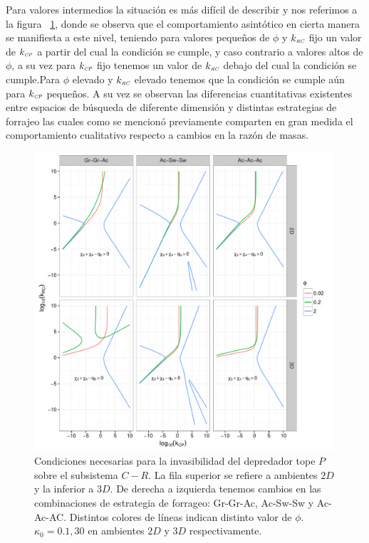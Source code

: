 Para valores intermedios la situaci\'on es m\'as dif\'icil de describir y nos referimos a la figura  ~\ref{fig:NC_PCR}, donde se observa que el comportamiento asint\'otico en cierta manera se manifiesta a este nivel, teniendo para valores peque\~nos de $\phi$ y $k_{\textit{\tiny RC}}$ fijo un valor de $k_{\textit{\tiny CP}}$ a partir del cual la condici\'on se cumple, y caso contrario a valores altos de $\phi$, a su vez para $k_{\textit{\tiny CP}}$ fijo tenemos un valor de $k_{\textit{\tiny RC}}$ debajo del cual la condici\'on se cumple.Para $\phi$ elevado y $k_{\textit{\tiny RC}}$ elevado tenemos que la condici\'on se cumple a\'un para $k_{\textit{\tiny CP}}$ peque\~nos. A su vez se observan las diferencias cuantitativas existentes entre espacios de b\'usqueda de diferente dimensi\'on y distintas estrategias de forrajeo las cuales como se mencion\'o previamente comparten en gran medida el comportamiento cualitativo respecto a cambios en la raz\'on de masas.

\begin{figure}[!htbp]
  \centering
  \includegraphics[width = 0.99\textwidth]{./Plots/NecPCR.pdf}
  \caption[Condiciones Necesarias $P \to C-R$]{Condiciones necesarias para la invasibilidad del depredador tope $P$ sobre el subsistema $C-R$. La fila superior se refiere a ambientes $2D$ y la inferior a $3D$. De derecha a izquierda tenemos cambios en las combinaciones de estrategia de forrageo: Gr-Gr-Ac, Ac-Sw-Sw y Ac-Ac-AC. Distintos colores de l\'ineas indican distinto valor de $\phi$.$\kappa_0= 0.1,30$ en ambientes $2D$ y $3D$ respectivamente. }
  \label{fig:NC_PCR}
\end{figure}

